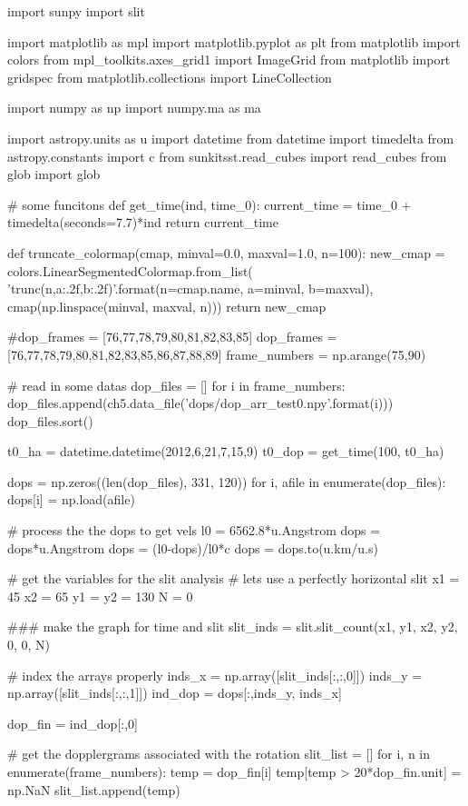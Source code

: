 \begin{pycode}[chapter5]
import sunpy
import slit

import matplotlib as mpl
import matplotlib.pyplot as plt
from matplotlib import colors
from mpl_toolkits.axes_grid1 import ImageGrid
from matplotlib import gridspec
from matplotlib.collections import LineCollection

import numpy as np
import numpy.ma as ma

import astropy.units as u
import datetime
from datetime import timedelta
from astropy.constants import c
from sunkitsst.read_cubes import read_cubes
from glob import glob

# some funcitons
def get_time(ind, time_0):
	current_time = time_0 + timedelta(seconds=7.7)*ind
	return current_time
	
def truncate_colormap(cmap, minval=0.0, maxval=1.0, n=100):
	new_cmap = colors.LinearSegmentedColormap.from_list(
				'trunc({n},{a:.2f},{b:.2f})'.format(n=cmap.name, a=minval, b=maxval),
				 cmap(np.linspace(minval, maxval, n)))
	return new_cmap

#dop_frames = [76,77,78,79,80,81,82,83,85]
dop_frames = [76,77,78,79,80,81,82,83,85,86,87,88,89]
frame_numbers = np.arange(75,90)

# read in some datas
dop_files = []
for i in frame_numbers:
	dop_files.append(ch5.data_file('dops/dop_arr_test0{}.npy'.format(i)))
dop_files.sort()

t0_ha = datetime.datetime(2012,6,21,7,15,9)
t0_dop = get_time(100, t0_ha)

dops = np.zeros((len(dop_files), 331, 120))
for i, afile in enumerate(dop_files):
	dops[i] = np.load(afile)

# process the the dops to get vels
l0 = 6562.8*u.Angstrom
dops = dops*u.Angstrom
dops = (l0-dops)/l0*c
dops = dops.to(u.km/u.s)

# get the variables for the slit analysis
# lets use a perfectly horizontal slit
x1 = 45
x2 = 65
y1 = y2 = 130
N = 0

### make the graph for time and slit
slit_inds = slit.slit_count(x1, y1, x2, y2, 0, 0, N)

# index the arrays properly
inds_x = np.array([slit_inds[:,:,0]])
inds_y = np.array([slit_inds[:,:,1]])
ind_dop = dops[:,inds_y, inds_x]

dop_fin = ind_dop[:,0]

# get the dopplergrams associated with the rotation
slit_list = []
for i, n in enumerate(frame_numbers):
	temp = dop_fin[i]
	temp[temp > 20*dop_fin.unit] = np.NaN
	slit_list.append(temp)


\end{pycode}
